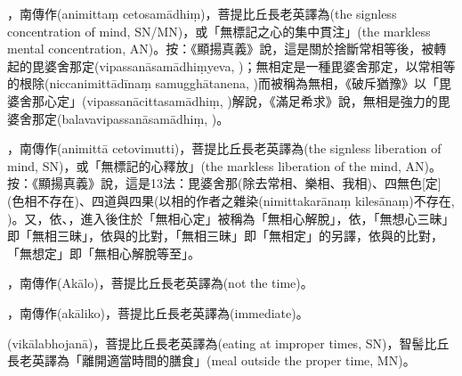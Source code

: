 \startitemgroup[noteitems]
\item{}，南傳作(animittaṃ cetosamādhiṃ)，菩提比丘長老英譯為(the signless concentration of mind, SN/MN)，或「無標記之心的集中貫注」(the markless mental concentration, AN)。按：《顯揚真義》說，這是關於捨斷常相等後，被轉起的毘婆舍那定(vipassanāsamādhiṃyeva, )；無相定是一種毘婆舍那定，以常相等的根除(niccanimittādīnaṃ samugghātanena, )而被稱為無相，《破斥猶豫》以「毘婆舍那心定」(vipassanācittasamādhiṃ, )解說，《滿足希求》說，無相是強力的毘婆舍那定(balavavipassanāsamādhiṃ, )。
\item{}，南傳作(animittā cetovimutti)，菩提比丘長老英譯為(the signless liberation of mind, SN)，或「無標記的心釋放」(the markless liberation of the mind, AN)。按：《顯揚真義》說，這是13法：毘婆舍那(除去常相、樂相、我相)、四無色[定](色相不存在)、四道與四果(以相的作者之雜染(nimittakarānaṃ kilesānaṃ)不存在, )。又，依、，進入後住於「無相心定」被稱為「無相心解脫」，依，「無想心三昧」即「無相三昧」，依與的比對，「無相三昧」即「無相定」的另譯，依與的比對，「無想定」即「無相心解脫等至」。
\stopitemgroup

\startitemgroup[noteitems]
\item{}，南傳作(Akālo)，菩提比丘長老英譯為(not the time)。
\item{}，南傳作(akāliko)，菩提比丘長老英譯為(immediate)。
\item{}(vikālabhojanā)，菩提比丘長老英譯為(eating at improper times, SN)，智髻比丘長老英譯為「離開適當時間的膳食」(meal outside the proper time, MN)。
\stopitemgroup

